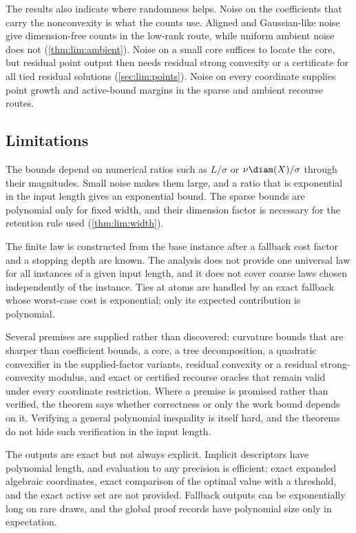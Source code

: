 The results also indicate where randomness helps. Noise on the coefficients
that carry the nonconvexity is what the counts use. Aligned and Gaussian-like
noise give dimension-free counts in the low-rank route, while uniform ambient
noise does not (\cref{thm:lim:ambient}). Noise on a small core suffices to
locate the core, but residual point output then needs residual strong
convexity or a certificate for all tied residual solutions
(\cref{sec:lim:points}). Noise on every coordinate supplies point growth and
active-bound margins in the sparse and ambient recourse routes.

\subsection{Limitations}\label{sec:disc:limits}

The bounds depend on numerical ratios such as $L/\sigma$ or
$\nu\diam(X)/\sigma$ through their magnitudes. Small noise makes them large,
and a ratio that is exponential in the input length gives an exponential
bound. The sparse bounds are polynomial only for fixed width, and their
dimension factor is necessary for the retention rule used
(\cref{thm:lim:width}).

The finite law is constructed from the base instance after a fallback cost
factor and a stopping depth are known. The analysis does not provide one
universal law for all instances of a given input length, and it does not
cover coarse laws chosen independently of the instance. Ties at atoms are
handled by an exact fallback whose worst-case cost is exponential; only its
expected contribution is polynomial.

Several premises are supplied rather than discovered: curvature bounds that
are sharper than coefficient bounds, a core, a tree decomposition, a
quadratic convexifier in the supplied-factor variants, residual convexity or
a residual strong-convexity modulus, and exact or certified recourse oracles
that remain valid under every coordinate restriction. Where a premise is
promised rather than verified, the theorem says whether correctness or only
the work bound depends on it. Verifying a general polynomial inequality is
itself hard, and the theorems do not hide such verification in the input
length.

The outputs are exact but not always explicit. Implicit descriptors have
polynomial length, and evaluation to any precision is efficient; exact
expanded algebraic coordinates, exact comparison of the optimal value with
a threshold, and the exact active set are not provided. Fallback outputs can
be exponentially long on rare draws, and the global proof records have
polynomial size only in expectation.

